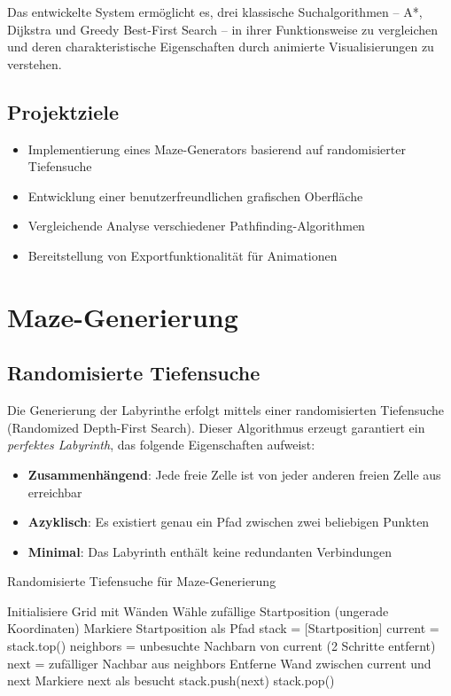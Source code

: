 \documentclass[12pt,a4paper]{article}
\begin{document}
Das entwickelte System ermöglicht es, drei klassische Suchalgorithmen -- A*, Dijkstra und Greedy Best-First Search -- in ihrer Funktionsweise zu vergleichen und deren charakteristische Eigenschaften durch animierte Visualisierungen zu verstehen.

\subsection{Projektziele}
\begin{itemize}
    \item Implementierung eines Maze-Generators basierend auf randomisierter Tiefensuche
    \item Entwicklung einer benutzerfreundlichen grafischen Oberfläche
    \item Vergleichende Analyse verschiedener Pathfinding-Algorithmen
    \item Bereitstellung von Exportfunktionalität für Animationen
\end{itemize}

\section{Maze-Generierung}

\subsection{Randomisierte Tiefensuche}

Die Generierung der Labyrinthe erfolgt mittels einer randomisierten Tiefensuche (Randomized Depth-First Search). Dieser Algorithmus erzeugt garantiert ein \textit{perfektes Labyrinth}, das folgende Eigenschaften aufweist:

\begin{itemize}
    \item \textbf{Zusammenhängend}: Jede freie Zelle ist von jeder anderen freien Zelle aus erreichbar
    \item \textbf{Azyklisch}: Es existiert genau ein Pfad zwischen zwei beliebigen Punkten
    \item \textbf{Minimal}: Das Labyrinth enthält keine redundanten Verbindungen
\end{itemize}

\begin{algorithm}[H]
\caption{Randomisierte Tiefensuche für Maze-Generierung}
\begin{algorithmic}[1]
\STATE Initialisiere Grid mit Wänden
\STATE Wähle zufällige Startposition (ungerade Koordinaten)
\STATE Markiere Startposition als Pfad
\STATE stack = [Startposition]
    \STATE current = stack.top()
    \STATE neighbors = unbesuchte Nachbarn von current (2 Schritte entfernt)
        \STATE next = zufälliger Nachbar aus neighbors
        \STATE Entferne Wand zwischen current und next
        \STATE Markiere next als besucht
        \STATE stack.push(next)
    \ELSE
        \STATE stack.pop()
    \ENDIF
\ENDWHILE
\end{algorithmic}
\end{algorithm}
\end{document}
